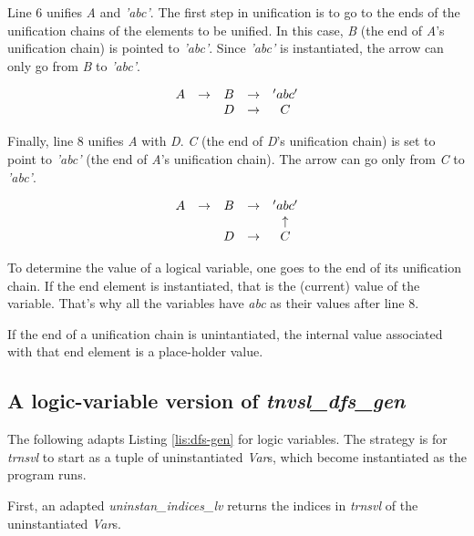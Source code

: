 Line 6 unifies \textit{A} and \textit{'abc'}. The first step in unification is to go to the ends of the unification chains of the elements to be unified. In this case, \textit{B} (the end of \textit{A}'s unification chain) is pointed to \textit{'abc'}. Since  \textit{'abc'} is instantiated, the arrow can only go from \textit{B} to \textit{'abc'}. 

\begin{equation}\label{eq:two}
\begin{array}{c c c c c c c c c c c}
A & \to & B            & \to & 'abc'    \\ 
  &     & D            & \to & C        
\end{array}
\end{equation}

Finally, line 8  unifies \textit{A} with \textit{D}. \textit{C} (the end of \textit{D}'s unification chain) is set to point to \textit{'abc'} (the end of \textit{A}'s unification chain). The arrow can go only from \textit{C} to \textit{'abc'}.

\begin{equation}\label{eq:three}
\begin{array}{c c c c c c c c c c c}
A & \to & B            & \to & 'abc'      \\ 
  &     &              &     & \uparrow   \\ 
  &     & D            & \to & C        
\end{array}
\end{equation}


To determine the value of a logical variable, one goes to the end of its unification chain. If the end element is instantiated, that is the (current) value of the variable. That's why all the variables have \textit{abc} as their values after line 8. 

If the end of a unification chain is unintantiated, the internal value associated with that end element is a place-holder value.

\smallv
\subsection{A logic-variable version of \textit{tnvsl\_dfs\_gen}}
The following adapts Listing \ref{lis:dfs-gen} for logic variables. The strategy is for \textit{trnsvl} to start as a tuple of uninstantiated \textit{Var}s, which become instantiated as the program runs.

First, an adapted \textit{uninstan\_indices\_lv} returns the indices in \textit{trnsvl} of the uninstantiated \textit{Var}s.

